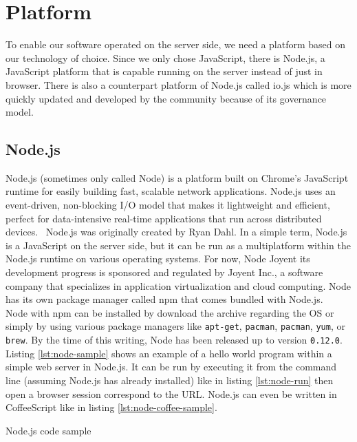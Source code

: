 \section{Platform}
\label{sec:platform}

To enable our software operated on the server side, we need a platform based on our technology of choice.
Since we only chose JavaScript, there is Node.js, a JavaScript platform that is capable running on the server instead of just in browser.
There is also a counterpart platform of Node.js called io.js which is more quickly updated and developed by the community because of its governance model.

\subsection{Node.js}

Node.js\textsuperscript{\textregistered} (sometimes only called Node) is
a platform built on Chrome's JavaScript runtime for easily building fast, scalable network applications.
Node.js uses an event-driven, non-blocking I/O model that makes it lightweight and efficient, perfect for data-intensive real-time applications that run across distributed devices.~\autocite{Joyent:2015:Node}
Node.js was originally created by Ryan Dahl.
In a simple term, Node.js is a JavaScript on the server side, but it can be run as a multiplatform within the Node.js runtime on various operating systems.
For now, Node Joyent its development progress is sponsored and regulated by Joyent Inc., a software company that specializes in application virtualization and cloud computing.
Node has its own package manager called \ac{npm} that comes bundled with Node.js.~\autocite{Vincent:2014:npm}
Node with npm can be installed by download the archive regarding the \ac{OS} or simply by using various package managers like \verb|apt-get|, \verb|pacman|, \verb|pacman|, \verb|yum|, or \verb|brew|.
By the time of this writing, Node has been released up to version \verb|0.12.0|.
Listing \autoref{lst:node-sample} shows an example of a hello world program within a simple web server in Node.js.
It can be run by executing it from the command line (assuming Node.js has already installed) like in listing \autoref{lst:node-run} then open a browser session correspond to the \ac{URL}.
Node.js can even be written in CoffeeScript like in listing \autoref{lst:node-coffee-sample}.

\begin{listing}[ht]
\caption{Node.js code sample}
\inputminted{javascript}{\dir/include/node-sample.js}
\label{lst:node-sample}
\end{listing}

